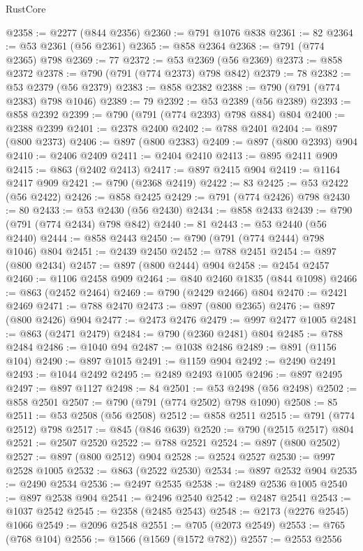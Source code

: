 \begin{lexlean}{RustCore}
\begin{coremodule}
@2358 := @2277 (@844 @2356)
@2360 := @791 @1076 @838
@2361 := 82
@2364 := @53 @2361 (@56 @2361)
@2365 := @858 @2364
@2368 := @791 (@774 @2365) @798
@2369 := 77
@2372 := @53 @2369 (@56 @2369)
@2373 := @858 @2372
@2378 := @790 (@791 (@774 @2373) @798 @842)
@2379 := 78
@2382 := @53 @2379 (@56 @2379)
@2383 := @858 @2382
@2388 := @790 (@791 (@774 @2383) @798 @1046)
@2389 := 79
@2392 := @53 @2389 (@56 @2389)
@2393 := @858 @2392
@2399 := @790 (@791 (@774 @2393) @798 @884) @804
@2400 := @2388 @2399
@2401 := @2378 @2400
@2402 := @788 @2401
@2404 := @897 (@800 @2373)
@2406 := @897 (@800 @2383)
@2409 := @897 (@800 @2393) @904
@2410 := @2406 @2409
@2411 := @2404 @2410
@2413 := @895 @2411 @909
@2415 := @863 (@2402 @2413)
@2417 := @897 @2415 @904
@2419 := @1164 @2417 @909
@2421 := @790 (@2368 @2419)
@2422 := 83
@2425 := @53 @2422 (@56 @2422)
@2426 := @858 @2425
@2429 := @791 (@774 @2426) @798
@2430 := 80
@2433 := @53 @2430 (@56 @2430)
@2434 := @858 @2433
@2439 := @790 (@791 (@774 @2434) @798 @842)
@2440 := 81
@2443 := @53 @2440 (@56 @2440)
@2444 := @858 @2443
@2450 := @790 (@791 (@774 @2444) @798 @1046) @804
@2451 := @2439 @2450
@2452 := @788 @2451
@2454 := @897 (@800 @2434)
@2457 := @897 (@800 @2444) @904
@2458 := @2454 @2457
@2460 := @1106 @2458 @909
@2464 := @840 @2460 @1835 (@844 @1098)
@2466 := @863 (@2452 @2464)
@2469 := @790 (@2429 @2466) @804
@2470 := @2421 @2469
@2471 := @788 @2470
@2473 := @897 (@800 @2365)
@2476 := @897 (@800 @2426) @904
@2477 := @2473 @2476
@2479 := @997 @2477 @1005
@2481 := @863 (@2471 @2479)
@2484 := @790 (@2360 @2481) @804
@2485 := @788 @2484
@2486 := @1040 @94
@2487 := @1038 @2486
@2489 := @891 (@1156 @104)
@2490 := @897 @1015
@2491 := @1159 @904
@2492 := @2490 @2491
@2493 := @1044 @2492
@2495 := @2489 @2493 @1005
@2496 := @897 @2495
@2497 := @897 @1127
@2498 := 84
@2501 := @53 @2498 (@56 @2498)
@2502 := @858 @2501
@2507 := @790 (@791 (@774 @2502) @798 @1090)
@2508 := 85
@2511 := @53 @2508 (@56 @2508)
@2512 := @858 @2511
@2515 := @791 (@774 @2512) @798
@2517 := @845 (@846 @639)
@2520 := @790 (@2515 @2517) @804
@2521 := @2507 @2520
@2522 := @788 @2521
@2524 := @897 (@800 @2502)
@2527 := @897 (@800 @2512) @904
@2528 := @2524 @2527
@2530 := @997 @2528 @1005
@2532 := @863 (@2522 @2530)
@2534 := @897 @2532 @904
@2535 := @2490 @2534
@2536 := @2497 @2535
@2538 := @2489 @2536 @1005
@2540 := @897 @2538 @904
@2541 := @2496 @2540
@2542 := @2487 @2541
@2543 := @1037 @2542
@2545 := @2358 (@2485 @2543)
@2548 := @2173 (@2276 @2545) @1066
@2549 := @2096 @2548
@2551 := @705 (@2073 @2549)
@2553 := @765 (@768 @104)
@2556 := @1566 (@1569 (@1572 @782))
@2557 := @2553 @2556

\end{coremodule}
\end{lexlean}
